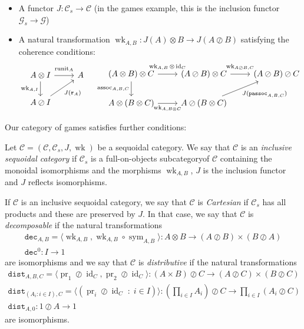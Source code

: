 \documentclass[a4paper,UKenglish]{lipics-v2016}
\theoremstyle{plain}
\theoremstyle{definition}
\newcommand*\from{\colon}
\DeclareMathOperator{\id}{id}
\DeclareMathOperator{\pr}{pr}
\newcommand{\tensor}{\otimes}
\newcommand{\sequoid}{\oslash}
\newcommand{\comp}[2]{#1 \circ #2}
\newcommand{\C}{\mathcal C}
\newcommand{\G}{\mathcal G}
\newcommand{\suchthat}{\;\colon\;}
\DeclareMathOperator{\assoc}{assoc}
\DeclareMathOperator{\runit}{runit}
\DeclareMathOperator{\sym}{sym}
\DeclareMathOperator{\wk}{wk}
\newcommand{\passoc}{{\mathtt{passoc}}}
\newcommand{\run}{{\mathtt{r}}}
\newcommand{\dist}{{\mathtt{dist}}}
\newcommand{\dec}{{\mathtt{dec}}}
\newlength{\arrow}
\begin{document}
\begin{definition}
\begin{itemize}
      \item A functor $J\from \C_s\to\C$ (in the games example, this is the inclusion functor $\G_s\to\G$)

      \item A natural transformation $\wk_{A,B}\from J(A)\tensor B\to J(A\sequoid B)$ satisfying the coherence conditions:
      \begin{equation*}
        \begin{tikzcd}
          A \tensor I \arrow[r, "\runit_A" yshift=0.3em] \arrow[d, "\wk_{A,I}"']
            & A \\
          A \sequoid I \arrow[ur, "J(\run_A)"']
            &
        \end{tikzcd}
        \quad
        \begin{tikzcd}
          (A \tensor B) \tensor C \arrow[r, "\wk_{A,B}\tensor\id_C" yshift=0.3em] \arrow[d, "\assoc_{A,B,C}"']
            & (A \sequoid B) \tensor C \arrow[r, "\wk_{A\sequoid B, C}" yshift=0.3em]
              & (A \sequoid B) \sequoid C\\
          A \tensor (B \tensor C) \arrow[r, "\wk_{A,B\tensor C}"']
            & A \sequoid (B \tensor C) \arrow[ur, "J(\passoc_{A,B,C})"']
              &
        \end{tikzcd}
      \end{equation*}
  \end{itemize}
\end{definition}

Our category of games satisfies further conditions:

\begin{definition}
  Let $\C=(\C,\C_s,J,\wk)$ be a sequoidal category.  We say that $\C$ is an \emph{inclusive sequoidal category} if $\C_s$ is a full-on-objects subcategoryof $\C$ containing the monoidal isomorphisms and the morphisms $\wk_{A,B}$, $J$ is the inclusion functor and $J$ reflects isomorphisms.

  If $\C$ is an inclusive sequoidal category, we say that $\C$ is \emph{Cartesian} if $\C_s$ has all products and these are preserved by $J$.  In that case, we say that $\C$ is \emph{decomposable} if the natural transformations
  \begin{gather*}
    \dec_{A,B} = \langle \wk_{A,B}, \comp{\wk_{A,B}}{\sym_{A,B}}\rangle\from A\tensor B\to (A\sequoid B)\times (B\sequoid A) \\
    \dec^0 \from I \to 1
  \end{gather*}
  are isomorphisms and we say that $\C$ is \emph{distributive} if the natural transformations
  \begin{gather*}
    \dist_{A,B,C} = \langle \pr_1\sequoid \id_C,\pr_2\sequoid\id_C\rangle\from (A\times B)\sequoid C\to (A\sequoid C)\times (B\sequoid C) \\
    \dist_{(A_i\colon i\in I),C} = \langle (\pr_i\sequoid\id_C\suchthat i\in I)\rangle \from \left(\prod_{i\in I} A_i\right) \sequoid C \to \prod_{i\in I}(A_i\sequoid C) \\
    \dist_{A,0}\from 1\sequoid A\to 1
  \end{gather*}
  are isomorphisms.
\end{definition}
\end{document}
